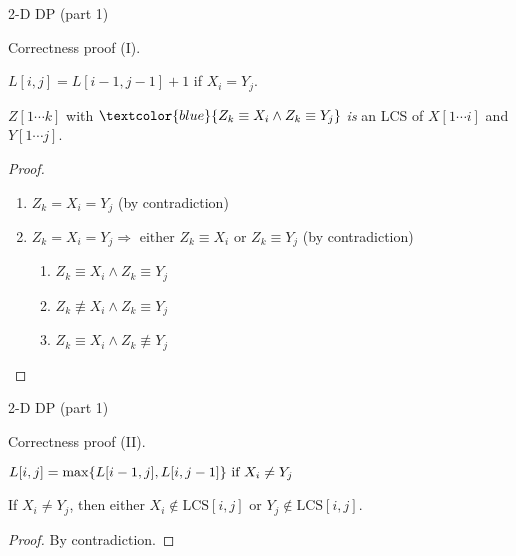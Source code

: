 \begin{frame}{2-D DP (part 1)}
  \begin{block}{Correctness proof (I).}
    \begin{theorem}{}
      $L[i,j] = L[i-1,j-1] + 1$ if $X_{i} = Y_{j}$.
    \end{theorem}

    \begin{theorem}{}
      $Z[1 \cdots k]$ with $\textcolor{blue}{Z_{k} \equiv X_{i} \land Z_{k} \equiv Y_{j}}$ \emph{is} an LCS of $X[1 \cdots i]$ and $Y[1 \cdots j]$.
    \end{theorem}
    \begin{proof}
      \begin{enumerate}
	\item $Z_{k} = X_{i} = Y_{j}$ (by contradiction)
	\item $Z_{k} = X_{i} = Y_{j} \Rightarrow \text{ either } Z_{k} \equiv X_{i} \text{ or } Z_{k} \equiv Y_{j}$ (by contradiction)
	  \begin{enumerate}
	    \item $Z_{k} \equiv X_{i} \land Z_{k} \equiv Y_{j}$
	    \item $Z_{k} \not\equiv X_{i} \land Z_{k} \equiv Y_{j}$
	    \item $Z_{k} \equiv X_{i} \land Z_{k} \not\equiv Y_{j}$
	  \end{enumerate}
      \end{enumerate}
    \end{proof}
  \end{block}
\end{frame}
\begin{frame}{2-D DP (part 1)}
  \begin{block}{Correctness proof (II).}
    \begin{theorem}{}
      $L[i,j] = \max \{L[i-1,j], L[i,j-1]\} \text{ if } X_{i} \neq Y_{j}$
    \end{theorem}

    \begin{theorem}{}
      If $X_{i} \neq Y_{j}$, then either $X_{i} \notin \text{LCS}[i,j]$ or $Y_{j} \notin \text{LCS}[i,j]$.
    \end{theorem}
    \begin{proof}
      By contradiction.
    \end{proof}
  \end{block}
\end{frame}
